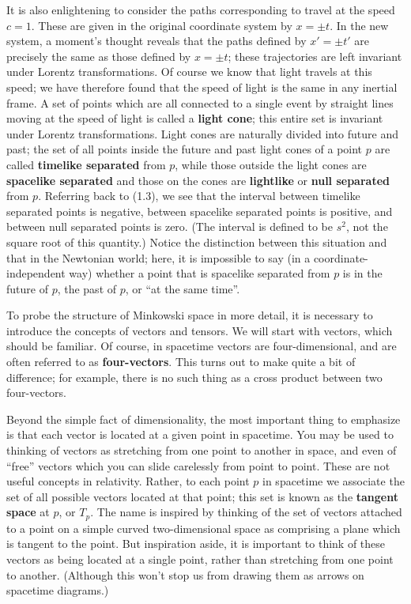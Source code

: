\documentclass[12pt]{article}
\begin{document}
It is also enlightening to consider the paths corresponding to travel
at the speed $c=1$.  These are given in the original coordinate system
by $x=\pm t$.  In the new system, a moment's thought reveals that the
paths defined by $x' = \pm t'$ are precisely the same as those defined
by $x=\pm t$; these trajectories are left invariant under Lorentz
transformations.  Of course we know that light travels at this speed;
we have therefore found that the speed of light is the same in any
inertial frame.  A set of points which are all connected to a single
event by straight lines moving at the speed of light is called a 
{\bf light cone}; this entire set is invariant under Lorentz
transformations.  Light cones are naturally divided into future
and past; the set of all points inside the future and past light
cones of a point $p$ are called {\bf timelike separated} from $p$,
while those outside the light cones are {\bf spacelike separated}
and those on the cones are {\bf lightlike} or {\bf null separated}
from $p$.  Referring back to (1.3), we see that the interval between
timelike separated points is negative, between spacelike separated
points is positive, and between null separated points is zero. 
(The interval is defined to be $s^2$, not the square root of this
quantity.)  Notice the distinction between this situation and that
in the Newtonian world; here, it is impossible to say (in a 
coordinate-independent way) whether a point that is spacelike separated
from $p$ is in the future of $p$, the past of $p$, or ``at the same 
time''.

To probe the structure of Minkowski space in more detail, it is 
necessary to introduce the concepts of vectors and tensors.  We will
start with vectors, which should be familiar.  Of course, in
spacetime vectors are four-dimensional, and are often referred to
as {\bf four-vectors}.  This turns out to make quite a bit of difference;
for example, there is no such thing as a cross product between two
four-vectors.

Beyond the simple fact of dimensionality, the most important thing to
emphasize is that each vector is located at a given point in spacetime.
You may be used to thinking of vectors as stretching from one point
to another in space, and even of ``free'' vectors which you can slide 
carelessly from point to point.  These are not useful concepts in
relativity.  Rather, to each point $p$ in spacetime we associate the
set of all possible vectors located at that point; this set is known
as the {\bf tangent space} at $p$, or $T_p$.  The name is inspired by
thinking of the set of vectors attached to a point on a simple curved
two-dimensional space as comprising a plane which is tangent to the
point.  But inspiration aside, it is important to think of these vectors
as being located at a single point, rather than stretching from one point
to another.  (Although this won't stop us from drawing them as arrows
on spacetime diagrams.)
\end{document}
